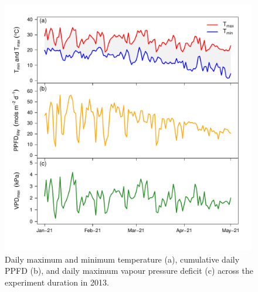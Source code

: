 \documentclass[a4paper]{article}\usepackage[]{graphicx}\usepackage[]{color}
\begin{document}
\begin{figure}[h!]
    \centering
    \includegraphics[width=0.99\textwidth]{airvars.pdf}
    \caption{Daily maximum and minimum temperature (a), cumulative daily PPFD (b), and daily maximum vapour pressure deficit (c) across the experiment duration in 2013.}
    \label{fig:figure1}
\end{figure}
\end{document}
